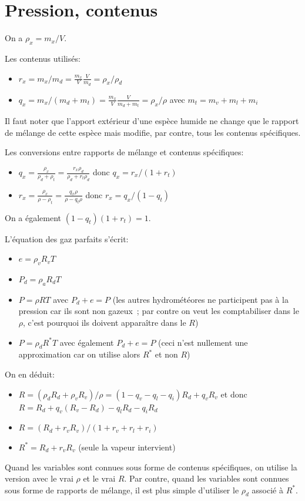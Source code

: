 \documentclass{article}
\begin{document}
\section{Pression, contenus}
\label{pression_contenus}
On a $\rho_x=m_x/V$.

Les contenus utilisés:
\begin{itemize}
 \item $r_x=m_x/m_d=\frac{m_x}{V}\frac{V}{m_d}=\rho_x/\rho_d$
 \item $q_x=m_x/(m_d+m_t)=\frac{m_x}{V}\frac{V}{m_d+m_t}=\rho_x/\rho$ avec $m_t=m_v+m_l+m_i$
\end{itemize}
Il faut noter que l'apport extérieur d'une espèce humide ne change que le rapport de mélange de cette espèce mais modifie, par contre, tous les contenus spécifiques.

Les conversions entre rapports de mélange et contenus spécifiques:
\begin{itemize}
 \item $q_x=\frac{\rho_x}{\rho_d+\rho_t}=\frac{r_x \rho_d}{\rho_d + r_t \rho_d}$ donc {\color{red} $q_x=r_x/(1+r_t)$}
 \item $r_x=\frac{\rho_x}{\rho-\rho_t}=\frac{q_x \rho}{\rho-q_t \rho}$ donc {\color{red} $r_x=q_x/(1-q_t)$}
\end{itemize}
On a également $(1-q_t)(1+r_t)=1$.

L'équation des gaz parfaits s'écrit:
\begin{itemize}
 \item $e=\rho_v R_v T$
 \item $P_d=\rho_a R_d T$
 \item $P=\rho R T$ avec $P_d+e=P$ (les autres hydrométéores ne participent pas à la pression car ils sont non gazeux~; par contre on veut les comptabiliser dans le $\rho$, c'est pourquoi ils doivent apparaître dans le $R$)
 \item {\color{red}$P=\rho_d R^* T$} avec également $P_d+e=P$ (ceci n'est nullement une approximation car on utilise alors $R^*$ et non $R$)
\end{itemize}
On en déduit:
\begin{itemize}
 \item $R=(\rho_d R_d + \rho_v R_v)/\rho=(1-q_v-q_l-q_i)R_d+q_v R_v$ et donc {\color{red}$R=R_d+q_v(R_v-R_d)-q_l R_d -q_i R_d$}
 \item $R=(R_d +r_v R_v)/(1+r_v+r_l+r_i)$
 \item {\color{red}$R^*=R_d + r_v R_v$} (seule la vapeur intervient)
\end{itemize}
Quand les variables sont connues sous forme de contenus spécifiques, on utilise la version avec le vrai $\rho$ et le vrai $R$.
Par contre, quand les variables sont connues sous forme de rapports de mélange, il est plus simple d'utiliser le $\rho_d$ associé à $R^*$.
\end{document}
